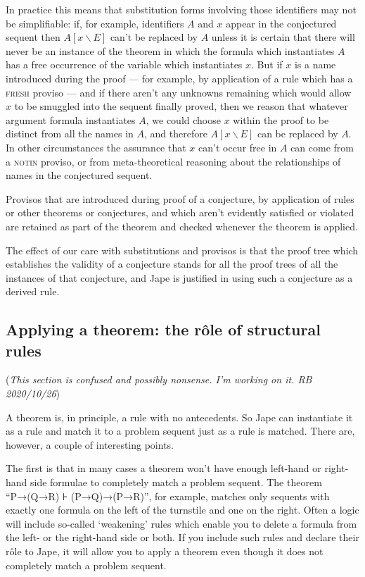 In practice this means that substitution forms involving those identifiers may not be simplifiable: if, for example, identifiers $A$ and $x$ appear in the conjectured sequent then $A[x\backslash E]$ can't be replaced by $A$ unless it is certain that there will never be an instance of the theorem in which the formula which instantiates $A$ has a free occurrence of the variable which instantiates $x$. But if $x$ is a name introduced during the proof --- for example, by application of a rule which has a \textsc{fresh} proviso --- and if there aren't any unknowns remaining which would allow $x$ to be smuggled into the sequent finally proved, then we reason that whatever argument formula instantiates $A$, we could choose $x$ within the proof to be distinct from all the names in $A$, and therefore $A[x\backslash E]$ can be replaced by $A$. In other circumstances the assurance that $x$ can't occur free in $A$ can come from a \textsc{notin} proviso, or from meta-theoretical reasoning about the relationships of names in the conjectured sequent.

Provisos that are introduced during proof of a conjecture, by application of rules or other theorems or conjectures, and which aren't evidently satisfied or violated are retained as part of the theorem and checked whenever the theorem is applied.

The effect of our care with substitutions and provisos is that the proof tree which establishes the validity of a conjecture stands for all the proof trees of all the instances of that conjecture, and Jape is justified in using such a conjecture as a derived rule.

\subsection{Applying a theorem: the r\^{o}le of structural rules}
\label{sec:basics:application}
(\emph{This section is confused and possibly nonsense. I'm working on it. RB 2020/10/26})

A theorem is, in principle, a rule with no antecedents. So Jape can instantiate it as a rule and match it to a problem sequent just as a rule is matched. There are, however, a couple of interesting points.

The first is that in many cases a theorem won't have enough left-hand or right-hand side formulae to completely match a problem sequent. The theorem ``P→(Q→R) ⊦ (P→Q)→(P→R)'', for example, matches only sequents with exactly one formula on the left of the turnstile and one on the right. Often a logic will include so-called `weakening' rules which enable you to delete a formula from the left- or the right-hand side or both. If you include such rules and declare their r\^{o}le to Jape, it will allow you to apply a theorem even though it does not completely match a problem sequent.


